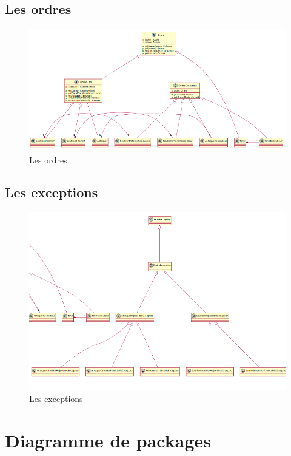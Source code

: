 	\subsection{Les ordres}
		\begin{figure}[!h]
			\centering
			\includegraphics[scale=0.5]{images/DCP2.png}
			\caption{Les ordres}
		\end{figure}

	\subsection{Les exceptions}
		\vspace{10mm}
		\begin{figure}[!h]
			\centering
			\includegraphics[scale=0.5]{images/DCP3.png}
			\caption{Les exceptions}
		\end{figure}
	\newpage

\section{Diagramme de packages}
